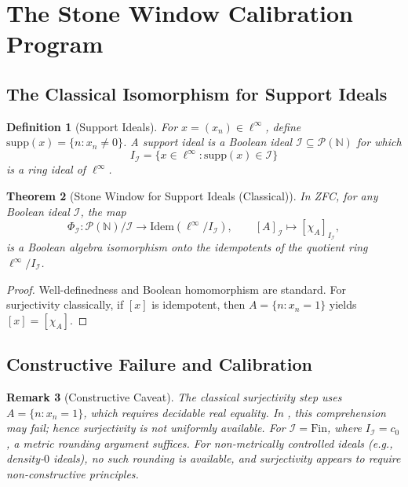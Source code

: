 \documentclass[11pt]{article}
\newtheorem{theorem}{Theorem}[section]
\newtheorem{definition}[theorem]{Definition}
\newtheorem{remark}[theorem]{Remark}
\newcommand{\N}{\mathbb{N}}
\newcommand{\BISH}{\mathrm{BISH}}
\newcommand{\linf}{\ell^\infty}
\newcommand{\czero}{c_0}
\newcommand{\supp}{\mathrm{supp}}
\newcommand{\Idem}{\mathrm{Idem}}
\begin{document}
\section{The Stone Window Calibration Program}

\subsection{The Classical Isomorphism for Support Ideals}

\begin{definition}[Support Ideals]
For $x=(x_n)\in \linf$, define $\supp(x)=\{n : x_n\neq 0\}$. A \emph{support ideal} is a Boolean ideal $\mathcal{I}\subseteq \mathcal{P}(\N)$ for which
\[
I_{\mathcal{I}}=\{x\in \linf : \supp(x)\in \mathcal{I}\}
\]
is a ring ideal of $\linf$.
\end{definition}

\begin{theorem}[Stone Window for Support Ideals (Classical)]\label{thm:stone-general-classical}
In ZFC, for any Boolean ideal $\mathcal{I}$, the map
\[
\Phi_{\mathcal{I}} : \mathcal{P}(\N)/\mathcal{I}\to \Idem(\linf/I_{\mathcal{I}}),\qquad [A]_{\mathcal{I}}\mapsto [\chi_A]_{I_{\mathcal{I}}},
\]
is a Boolean algebra isomorphism onto the idempotents of the quotient ring $\linf/I_{\mathcal{I}}$.
\end{theorem}
\begin{proof}
Well-definedness and Boolean homomorphism are standard. For surjectivity classically, if $[x]$ is idempotent, then $A=\{n:x_n=1\}$ yields $[x]=[\chi_A]$.
\end{proof}

\subsection{Constructive Failure and Calibration}

\begin{remark}[Constructive Caveat]\label{rem:constructive-caveat}
The classical surjectivity step uses $A=\{n:x_n=1\}$, which requires decidable real equality. In \BISH, this comprehension may fail; hence surjectivity is not uniformly available. For $\mathcal{I}=\mathrm{Fin}$, where $I_{\mathcal{I}}=\czero$, a metric rounding argument suffices. For non-metrically controlled ideals (e.g., density-$0$ ideals), no such rounding is available, and surjectivity appears to require non-constructive principles.
\end{remark}
\end{document}
